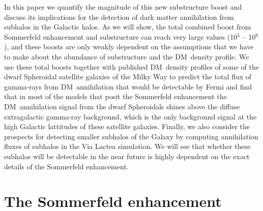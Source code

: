\documentclass[aps,prd,twocolumn,amsmath,amssymb,floatfix,nofootinbib,10pt]{revtex4}
\newcommand{\VL}{Via Lactea}
\newcommand{\DM}{DM}
\begin{document}
In this paper we quantify the magnitude of this new substructure boost
and discuss its implications for the detection of dark matter
annihilation from subhalos in the Galactic halos. As we will show, the
total combined boost from Sommerfeld enhancement and substructure can
reach very large values (10$^5$ -- 10$^9$), and these boosts are only
weakly dependent on the assumptions that we have to make about the
abundance of substructure and the \DM\ density profile. We use these
total boosts together with published \DM\ density profiles of some of
the dwarf Spheroidal satellite galaxies of the Milky Way to predict
the total flux of gamma-rays from \DM\ annihilation that would be
detectable by Fermi and find that in most of the models that posit the
Sommerfeld enhancement the \DM\ annihilation signal from the dwarf
Spheroidals shines above the diffuse extragalactic gamma-ray
background, which is the only background signal at the high Galactic
lattitudes of these satellite galaxies. Finally, we also consider the
prospects for detecting smaller subhalos of the Galaxy by computing
annihilation fluxes of subhalos in the \VL{} simulation. We will see
that whether these subhalos will be detectable in the near future is
highly dependent on the exact details of the Sommerfeld enhancement.




\section{The Sommerfeld enhancement}
\end{document}
